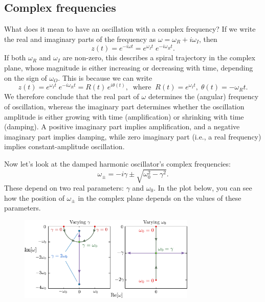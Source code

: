 \documentclass[10pt,a4paper]{article}
\begin{document}
\subsection{Complex frequencies}
\label{complex-frequencies}

What does it mean to have an oscillation with a complex frequency? If
we write the real and imaginary parts of the frequency as $\omega =
\omega_R + i \omega_I$, then
\begin{equation}
  z(t) = e^{-i\omega t} = e^{\omega_I t} \; e^{-i\omega_R t}.
\end{equation}
If both $\omega_R$ and $\omega_I$ are non-zero, this describes a
spiral trajectory in the complex plane, whose magnitude is either
increasing or decreasing with time, depending on the sign of
$\omega_O$. This is because we can write
\begin{equation}
  z(t) = e^{\omega_I t} \; e^{-i\omega_R t} = R(t)\, e^{i\theta(t)}, \;\;\mathrm{where}\;\;R(t) = e^{\omega_I t}, \; \theta(t) = -\omega_R t.
\end{equation}
We therefore conclude that the real part of $\omega$ determines the
(angular) frequency of oscillation, whereas the imaginary part
determines whether the oscillation amplitude is either growing with
time (amplification) or shrinking with time (damping). A positive
imaginary part implies amplification, and a negative imaginary part
implies damping, while zero imaginary part (i.e., a real frequency)
implies constant-amplitude oscillation.

Now let's look at the damped harmonic oscillator's complex
frequencies:
\begin{equation}
  \omega_\pm = -i\gamma \pm \sqrt{\omega_0^2 - \gamma^2}.
\end{equation}
These depend on two real parameters: $\gamma$ and $\omega_0$. In the
plot below, you can see how the position of $\omega_\pm$ in the
complex plane depends on the values of these parameters.

\begin{figure}[h]
  \centering\includegraphics[width=0.75\textwidth]{oscillator_frequencies}
\end{figure}
\end{document}
